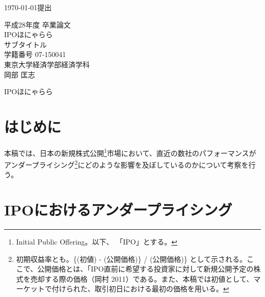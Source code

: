 \documentclass{jsarticle}
\begin{document}
\renewcommand\thefootnote{\arabic{footnote})}



{\Large \today 提出}\\ %

\begin{center}
\vspace{120truept}
{\huge 平成28年度 卒業論文\\[10mm]
IPOほにゃらら}\\ %
\vspace{10truept}
{\Large サブタイトル}\\ %
\vspace{120truept}
{\huge 学籍番号 07-150041}\\ %
\vspace{50truept}
{\huge 東京大学経済学部経済学科\\[50truept]
岡部 匡志}\\ %

\end{center}
\newpage
\begin{center}
{\Large IPOほにゃらら}\\ %
\end{center}

\tableofcontents
\vspace{120truept}
\section{はじめに}
本稿では、日本の新規株式公開\footnote[1]{Initial Public Offering。以下、 「IPO」とする。}市場において、直近の数社のパフォーマンスがアンダープライシング\footnote[2]{初期収益率とも。\{(初値) - (公開価格)\} / (公開価格)\} として示される。ここで、公開価格とは、「IPO直前に希望する投資家に対して新規公開予定の株式を売却する際の価格（岡村 2011\cite{okamura}）である。また、本稿では初値として、マーケットで付けられた、取引初日における最初の価格を用いる。}にどのような影響を及ぼしているのかについて考察を行う。
\section{IPOにおけるアンダープライシング}
\end{document}
